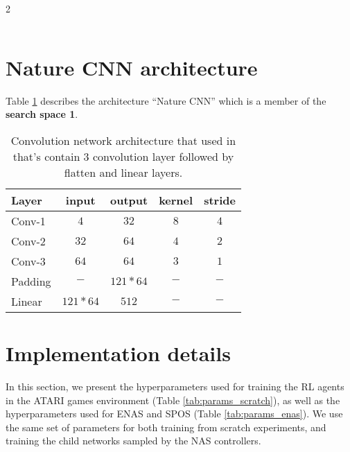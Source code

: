 \documentclass{svproc}
\begin{document}
\begin{appendix}
\begin{table*}[!h]
\begin{multicols}{2}
\begin{center}
\begin{tabularx}{0.5\textwidth}{@{}lcccc@{}}
    \end{tabularx}
    \end{center}
\end{multicols}
\caption{Detailed description of the search spaces.}
\label{search_spaces_table}
\end{table*}


\section{Nature CNN architecture}
\label{app:nature-CNN-architecture}
Table \ref{tab:nature-cnn} describes the architecture ``Nature CNN'' \cite{Humanlevel2015} which is a member of the  \textbf{search space 1}.
\begin{table}[!h]
\begin{center}
\begin{tabularx}{0.5\textwidth}{@{}lcccc@{}}
    \hline
    \textbf{Layer} & \textbf{input} & \textbf{output} & \textbf{kernel} & \textbf{stride}\\
    \hline
        Conv-1 & $4$ & $32$ & $8$ & $4$         \\
        Conv-2 & $32$ & $64$ & $4$ & $2$        \\
        Conv-3 & $64$ & $64$ & $3$ & $1$        \\
        Padding & $-$ & $121*64$ & $-$ & $-$    \\
        Linear & $121*64$ & $512$ & $-$ & $-$   \\
    \hline
\end{tabularx}
\caption{Convolution network architecture that used in \cite{Humanlevel2015} that's contain 3 convolution layer followed by flatten and linear layers.}\label{tab:nature-cnn}
\end{center}
\end{table}

\section{Implementation details}
\label{app:hyperparams}
In this section, we present the hyperparameters used for training the RL agents in the ATARI games environment (Table \ref{tab:params_scratch}), as well as the hyperparameters used for ENAS and SPOS (Table \ref{tab:params_enas}).
We use the same set of parameters for both training from scratch experiments, and training the child networks sampled by the NAS controllers.


\end{appendix}
\end{document}

